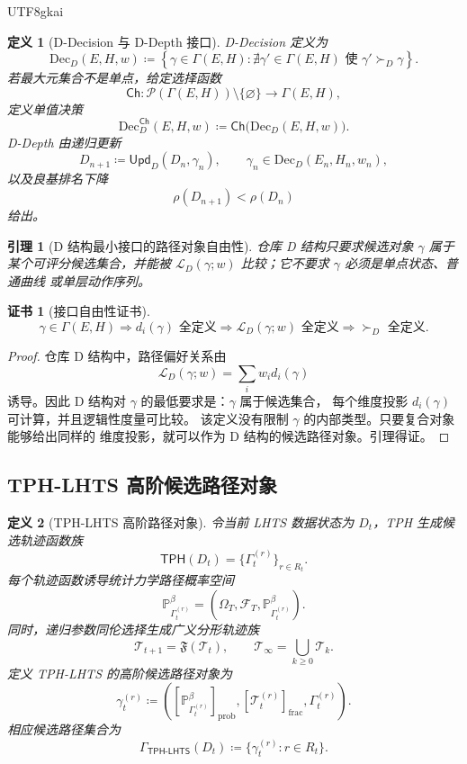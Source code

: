 \documentclass[12pt]{article}
\newtheorem{definition}{定义}[section]
\newtheorem{lemma}{引理}[section]
\newtheorem{Certificate}{证书}[section]
\newcommand{\TPH}{\ensuremath{\mathsf{TPH}}}
\newcommand{\TPHLHTS}{\ensuremath{\mathsf{TPH\mbox{-}LHTS}}}
\newcommand{\DefEq}{\coloneqq}
\newcommand{\Prob}{\mathbb P}
\begin{document}
\begin{CJK*}{UTF8}{gkai}
\begin{definition}[D-Decision 与 D-Depth 接口]
D-Decision 定义为
\[
\mathrm{Dec}_D(E,H,w)
\DefEq
\left\{
\gamma\in\Gamma(E,H):
\nexists\gamma'\in\Gamma(E,H)\text{ 使 }\gamma'\succ_D\gamma
\right\}.
\]
若最大元集合不是单点，给定选择函数
\[
\mathsf{Ch}:\mathcal P(\Gamma(E,H))\setminus\{\varnothing\}\to\Gamma(E,H),
\]
定义单值决策
\[
\mathrm{Dec}_D^{\mathsf{Ch}}(E,H,w)
\DefEq
\mathsf{Ch}\bigl(\mathrm{Dec}_D(E,H,w)\bigr).
\]
D-Depth 由递归更新
\[
D_{n+1}
\DefEq
\mathsf{Upd}_D(D_n,\gamma_n),
\qquad
\gamma_n\in\mathrm{Dec}_D(E_n,H_n,w_n),
\]
以及良基排名下降
\[
\rho(D_{n+1})<\rho(D_n)
\]
给出。
\end{definition}

\begin{lemma}[D 结构最小接口的路径对象自由性]
仓库 D 结构只要求候选对象 \(\gamma\) 属于某个可评分候选集合，并能被
\(\mathcal L_D(\gamma;w)\) 比较；它不要求 \(\gamma\) 必须是单点状态、普通曲线
或单层动作序列。
\end{lemma}

\begin{Certificate}[接口自由性证书]
\[
\boxed{
\gamma\in\Gamma(E,H)
\Rightarrow
d_i(\gamma)\text{ 全定义}
\Rightarrow
\mathcal L_D(\gamma;w)\text{ 全定义}
\Rightarrow
\succ_D\text{ 全定义}.
}
\]
\end{Certificate}

\begin{proof}
仓库 D 结构中，路径偏好关系由
\[
\mathcal L_D(\gamma;w)=\sum_iw_id_i(\gamma)
\]
诱导。因此 D 结构对 \(\gamma\) 的最低要求是：\(\gamma\) 属于候选集合，
每个维度投影 \(d_i(\gamma)\) 可计算，并且逻辑性度量可比较。
该定义没有限制 \(\gamma\) 的内部类型。只要复合对象能够给出同样的
维度投影，就可以作为 D 结构的候选路径对象。引理得证。
\end{proof}

\subsection{TPH-LHTS 高阶候选路径对象}
\label{subsec:tph-lhts-high-order-path-object}

\begin{definition}[TPH-LHTS 高阶路径对象]
令当前 LHTS 数据状态为 \(D_t\)，TPH 生成候选轨迹函数族
\[
\TPH(D_t)=\{\Gamma_t^{(r)}\}_{r\in R_t}.
\]
每个轨迹函数诱导统计力学路径概率空间
\[
\mathbb P_{\Gamma_t^{(r)}}^\beta
=
(\Omega_T,\mathscr F_T,\Prob_{\Gamma_t^{(r)}}^\beta).
\]
同时，递归参数同伦选择生成广义分形轨迹族
\[
\mathcal T_{t+1}=\mathfrak F(\mathcal T_t),
\qquad
\mathcal T_\infty=\bigcup_{k\ge0}\mathcal T_k.
\]
定义 TPH-LHTS 的高阶候选路径对象为
\[
\boxed{
\gamma_t^{(r)}
\DefEq
\left(
[\mathbb P_{\Gamma_t^{(r)}}^\beta]_{\mathrm{prob}},
[\mathcal T_t^{(r)}]_{\mathrm{frac}},
\Gamma_t^{(r)}
\right).
}
\]
相应候选路径集合为
\[
\boxed{
\Gamma_{\TPHLHTS}(D_t)
\DefEq
\{\gamma_t^{(r)}:r\in R_t\}.
}
\]
\end{definition}


\end{CJK*}
\end{document}
